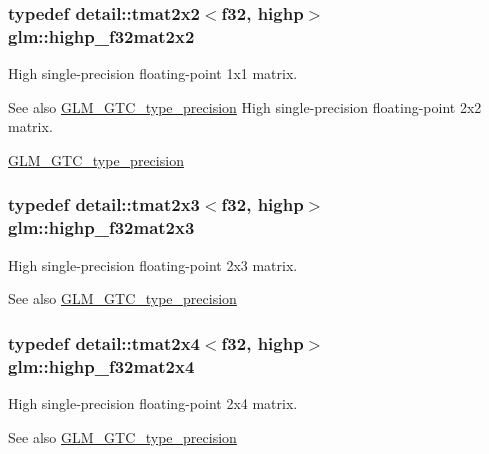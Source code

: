 \subsubsection[{\texorpdfstring{highp\+\_\+f32mat2x2}{highp_f32mat2x2}}]{\setlength{\rightskip}{0pt plus 5cm}typedef detail\+::tmat2x2$<$f32, highp$>$ {\bf glm\+::highp\+\_\+f32mat2x2}}\hypertarget{group__gtc__type__precision_gaf3a2cc948ca6fd168391138ce6fdd100}{}\label{group__gtc__type__precision_gaf3a2cc948ca6fd168391138ce6fdd100}
High single-\/precision floating-\/point 1x1 matrix. \begin{DoxySeeAlso}{See also}
\hyperlink{group__gtc__type__precision}{G\+L\+M\+\_\+\+G\+T\+C\+\_\+type\+\_\+precision} High single-\/precision floating-\/point 2x2 matrix. 

\hyperlink{group__gtc__type__precision}{G\+L\+M\+\_\+\+G\+T\+C\+\_\+type\+\_\+precision} 
\end{DoxySeeAlso}
\subsubsection[{\texorpdfstring{highp\+\_\+f32mat2x3}{highp_f32mat2x3}}]{\setlength{\rightskip}{0pt plus 5cm}typedef detail\+::tmat2x3$<$f32, highp$>$ {\bf glm\+::highp\+\_\+f32mat2x3}}\hypertarget{group__gtc__type__precision_ga53613c1b93f81207065a8a935ff02a81}{}\label{group__gtc__type__precision_ga53613c1b93f81207065a8a935ff02a81}
High single-\/precision floating-\/point 2x3 matrix. \begin{DoxySeeAlso}{See also}
\hyperlink{group__gtc__type__precision}{G\+L\+M\+\_\+\+G\+T\+C\+\_\+type\+\_\+precision} 
\end{DoxySeeAlso}
\subsubsection[{\texorpdfstring{highp\+\_\+f32mat2x4}{highp_f32mat2x4}}]{\setlength{\rightskip}{0pt plus 5cm}typedef detail\+::tmat2x4$<$f32, highp$>$ {\bf glm\+::highp\+\_\+f32mat2x4}}\hypertarget{group__gtc__type__precision_ga9689dbe21bc976ca8069c63300b5887e}{}\label{group__gtc__type__precision_ga9689dbe21bc976ca8069c63300b5887e}
High single-\/precision floating-\/point 2x4 matrix. \begin{DoxySeeAlso}{See also}
\hyperlink{group__gtc__type__precision}{G\+L\+M\+\_\+\+G\+T\+C\+\_\+type\+\_\+precision} 
\end{DoxySeeAlso}
